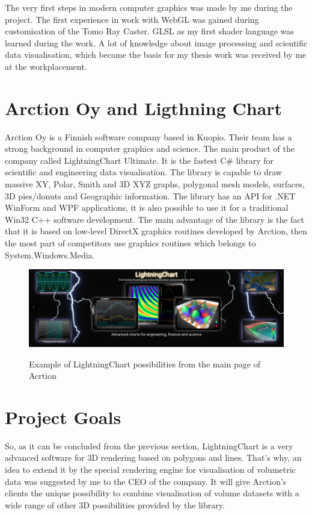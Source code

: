 \documentclass[twoside, english, 11pt]{report}
\begin{document}
The very first steps in modern computer graphics was made by me during the project. The first experience in work with WebGL was gained during customisation of the Tomo Ray Caster. GLSL as my first shader language was learned during the work. A lot of knowledge about image processing and scientific data visualisation, which became the basis for my thesis work was received by me at the workplacement.


\section{Arction Oy and Ligthning Chart}

Arction Oy is a Finnish software company based in Kuopio. Their team has a strong background in computer graphics and science. The main product of the company called LightningChart Ultimate. It is the fastest C\# library for scientific and engineering data visualisation. The library is capable to draw massive XY, Polar, Smith and 3D XYZ graphs, polygonal mesh models, surfaces, 3D pies/donuts and Geographic information. The library has an API for .NET WinForm and WPF applications, it is also possible to use it for a traditional Win32 C++ software development. The main advantage of the library is the fact that it is based on low-level DirectX graphics routines developed by Arction, then the most part of competitors use graphics routines which belongs to System.Windows.Media.\\
\begin{figure}[!h]
\includegraphics[scale=0.33]{img/lchu}\\
\caption{Example of LightningChart possibilities from the main page of Acrtion}
\end{figure}

\section{Project Goals}

So, as it can be concluded from the previous section, LightningChart is a very advanced software for 3D rendering based on polygons and lines. That's why, an idea to extend it by the special rendering engine for visualisation of volumetric data was suggested by me to the CEO of the company. It will give Arction's clients the unique possibility to combine visualisation of volume datasets with a wide range of other 3D possibilities provided by the library. \\
\end{document}
